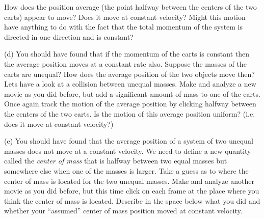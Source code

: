 \pagebreak[2]

How does the position average (the point halfway between the centers of the two carts) appear to move? Does it move at constant velocity? Might this motion have anything to do with the fact that the total momentum of the system is directed in one direction and is constant?
\answerspace{40mm}

(d) You should have found that if the momentum of the carts is constant then
the average position moves at a constant rate also. Suppose the masses of the
carts are unequal? How does the average position of the two objects move then?
Lets have a look at a collision between unequal masses. Make and analyze a new
movie as you did before, but add a significant amount of mass to one of the
carts. Once again track the motion of the average position by clicking halfway
between the centers of the two carts. Is the motion of this average position
uniform? (i.e. does it move at constant velocity?)
\answerspace{40mm}

(e) You should have found that the average position of a system of two unequal masses does not move at a constant velocity. We need to define a new quantity called the \textit{center of mass} that is halfway between two equal masses but somewhere else when one of the masses is larger. Take a guess as to where the center of mass is located for the two unequal masses. Make and analyze another movie as you did before, but this time click on each frame at the place where you think the center of mass is located. Describe in the space below what you did and whether your ``assumed'' center of mass position moved at constant velocity.

